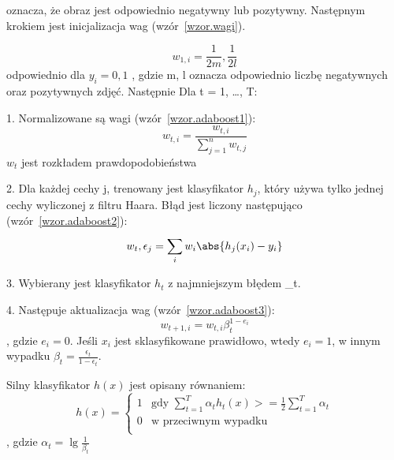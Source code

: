 \documentclass[a4paper,twoside,12pt]{book}
\begin{document}
    oznacza, że obraz jest odpowiednio negatywny lub pozytywny.
    Następnym krokiem jest inicjalizacja wag (wzór~\ref{wzor.wagi}).

    \large
    \begin{equation}
        w_{1,i} = \frac{1}{2m}, \frac{1}{2l}
        \label{wzor.wagi}
    \end{equation}
    \normalsize
    odpowiednio dla $y_i = 0, 1$
    , gdzie m, l oznacza odpowiednio liczbę negatywnych oraz pozytywnych zdjęć.
    Następnie
    Dla t = 1, \ldots, T:

    1. Normalizowane są wagi (wzór~\ref{wzor.adaboost1}):
    \large
    \begin{equation}
        w_{t,i} = \frac{w_{t,i}}{\sum_{j=1}^{n}w_{t,j}}
        \label{wzor.adaboost1}
    \end{equation}
    \normalsize
    $w_{t}$ jest rozkładem prawdopodobieństwa

    2. Dla każdej cechy j, trenowany jest klasyfikator $h_{j}$, który używa tylko jednej cechy wyliczonej z filtru Haara.
    Błąd jest liczony następująco (wzór~\ref{wzor.adaboost2}):
    \large
    \begin{equation}
        w_{t}, \epsilon_{j} = \sum_{i}^{}w_{i} \abs{h_{j}(x_{i}) - y_{i}}
        \label{wzor.adaboost2}
    \end{equation}
    \normalsize

    3. Wybierany jest klasyfikator $h_{t}$ z najmniejszym błędem \epsilon_{t}.

    4. Następuje aktualizacja wag (wzór~\ref{wzor.adaboost3}):
    \large
    \begin{equation}
        w_{t+1,i} = w_{t,i}\beta_{t}^{1-e_{i}}
        \label{wzor.adaboost3}
    \end{equation}
    \normalsize
    , gdzie $e_{i} = 0$. Jeśli $x_{i}$ jest sklasyfikowane prawidłowo, wtedy $e_{i}=1$,
    w innym wypadku $\beta_{t} = \frac{\epsilon_{t}}{1 - \epsilon_{t}}$.

    Silny klasyfikator $h(x)$ jest opisany równaniem:
    \large
    \begin{equation}
        h(x) = \left\{ \begin{array}{ll}
                           1 & \textrm{gdy $\sum_{t=1}^{T}\alpha_{t}h_{t}(x) >= \frac{1}{2} \sum_{t=1}^{T}\alpha_{t}$}\\
                           0 & \textrm{w przeciwnym wypadku}\\
        \end{array} \right.
        \label{wzor.adaboost4}
    \end{equation}
    \normalsize
    , gdzie $\alpha_{t} = \lg \frac{1}{\beta_{t}}$
\end{document}

